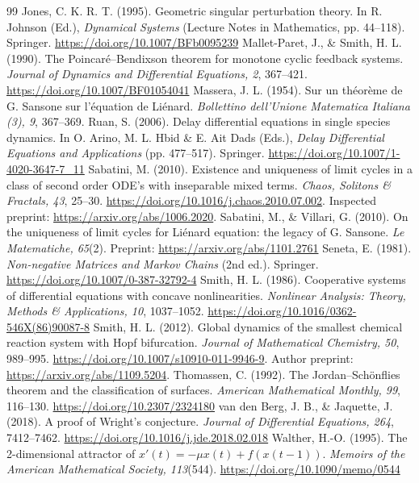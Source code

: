 \begin{thebibliography}{99}
 Jones, C. K. R. T. (1995). Geometric singular perturbation theory. In R. Johnson (Ed.), \emph{Dynamical Systems} (Lecture Notes in Mathematics, pp. 44--118). Springer. \url{https://doi.org/10.1007/BFb0095239}
 Mallet-Paret, J., \& Smith, H. L. (1990). The Poincar\'e--Bendixson theorem for monotone cyclic feedback systems. \emph{Journal of Dynamics and Differential Equations, 2}, 367--421. \url{https://doi.org/10.1007/BF01054041}
 Massera, J. L. (1954). Sur un th\'eor\`eme de G. Sansone sur l'\'equation de Li\'enard. \emph{Bollettino dell'Unione Matematica Italiana (3), 9}, 367--369.
 Ruan, S. (2006). Delay differential equations in single species dynamics. In O. Arino, M. L. Hbid \& E. Ait Dads (Eds.), \emph{Delay Differential Equations and Applications} (pp. 477--517). Springer. \url{https://doi.org/10.1007/1-4020-3647-7_11}
 Sabatini, M. (2010). Existence and uniqueness of limit cycles in a class of second order ODE's with inseparable mixed terms. \emph{Chaos, Solitons \& Fractals, 43}, 25--30. \url{https://doi.org/10.1016/j.chaos.2010.07.002}. Inspected preprint: \url{https://arxiv.org/abs/1006.2020}.
 Sabatini, M., \& Villari, G. (2010). On the uniqueness of limit cycles for Li\'enard equation: the legacy of G. Sansone. \emph{Le Matematiche, 65}(2). Preprint: \url{https://arxiv.org/abs/1101.2761}
 Seneta, E. (1981). \emph{Non-negative Matrices and Markov Chains} (2nd ed.). Springer. \url{https://doi.org/10.1007/0-387-32792-4}
 Smith, H. L. (1986). Cooperative systems of differential equations with concave nonlinearities. \emph{Nonlinear Analysis: Theory, Methods \& Applications, 10}, 1037--1052. \url{https://doi.org/10.1016/0362-546X(86)90087-8}
 Smith, H. L. (2012). Global dynamics of the smallest chemical reaction system with Hopf bifurcation. \emph{Journal of Mathematical Chemistry, 50}, 989--995. \url{https://doi.org/10.1007/s10910-011-9946-9}. Author preprint: \url{https://arxiv.org/abs/1109.5204}.
 Thomassen, C. (1992). The Jordan--Sch\"onflies theorem and the classification of surfaces. \emph{American Mathematical Monthly, 99}, 116--130. \url{https://doi.org/10.2307/2324180}
 van den Berg, J. B., \& Jaquette, J. (2018). A proof of Wright's conjecture. \emph{Journal of Differential Equations, 264}, 7412--7462. \url{https://doi.org/10.1016/j.jde.2018.02.018}
 Walther, H.-O. (1995). The 2-dimensional attractor of $x'(t)=-\mu x(t)+f(x(t-1))$. \emph{Memoirs of the American Mathematical Society, 113}(544). \url{https://doi.org/10.1090/memo/0544}

\end{thebibliography}
